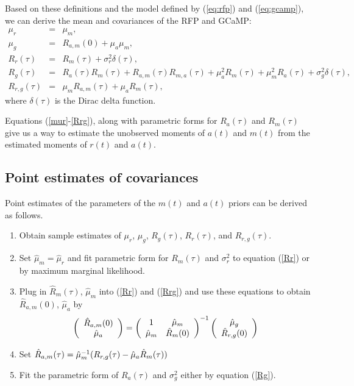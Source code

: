 \documentclass[11pt]{article}
\begin{document}
Based on these definitions and the model defined by (\ref{eq:rfp}) and (\ref{eq:gcamp}), we can derive the mean and covariances of the RFP and GCaMP:
 \begin{eqnarray}
\mu_r &=&\mu_m, \label{mur}\\
\mu_g&=&R_{a,m}(0) + \mu_a\mu_m, \label{mug} \\
R_r(\tau) &=& R_m(\tau)+\sigma^2_r\delta(\tau),\label{Rr}\\
R_g(\tau) &=& R_a(\tau)R_m(\tau)+R_{a,m}(\tau)R_{m,a}(\tau) +\mu_a^2R_{m}(\tau)+\mu_m^2R_{a}(\tau)+\sigma^2_g\delta(\tau),\label{Rg}\\
R_{r,g}(\tau) &=& \mu_mR_{a,m}(\tau)+\mu_aR_{m}(\tau),\label{Rrg}
\end{eqnarray}
where $\delta(\tau)$ is the Dirac delta function.

Equations (\ref{mur}-\ref{Rrg}), along with parametric forms for $R_a(\tau)$ and $R_m(\tau)$ give us a way to estimate the unobserved moments of $a(t)$ and $m(t)$ from the estimated moments of $r(t)$ and $a(t)$.

\subsection{Point estimates of covariances}
Point estimates of the parameters of the $m(t)$ and $a(t)$ priors can be derived as follows.
\begin{enumerate}
\item Obtain sample estimates of $\mu_r$, $\mu_g$, $R_g(\tau)$, $R_r(\tau)$, and $R_{r,g}(\tau)$.
\item Set $\hat{\mu}_m = \hat{\mu}_r$ and fit parametric form for $R_m(\tau)$ and $\sigma^2_r$ to equation (\ref{Rr}) or by maximum marginal likelihood.

\item Plug in $\hat{R}_m(\tau)$, $\hat{\mu}_m$ into (\ref{Rr}) and (\ref{Rrg}) and use these equations to obtain $\hat{R}_{a,m}(0)$, $\hat{\mu}_a$ by
\begin{equation}
\left(\begin{array}{c}\hat{R}_{a,m}(0)\\\hat{\mu}_a\end{array}\right)=\left(
\begin{array}{cc}
1 & \hat{\mu}_m\\
\hat{\mu}_m & \hat{R}_m(0)\\
\end{array}
\right)^{-1}\left(
\begin{array}{c}
\hat{\mu}_g\\
\hat{R}_{r,g}(0)
\end{array}
\right)
\end{equation}
\item Set $\hat{R}_{a,m}(\tau) = \hat{\mu}_m^{-1}(R_{r,g}(\tau) - \hat{\mu}_a\hat{R}_m(\tau))$
\item Fit the parametric form of $R_a(\tau)$ and $\sigma_g^2$ either by equation (\ref{Rg}).
\end{enumerate}
\end{document}
